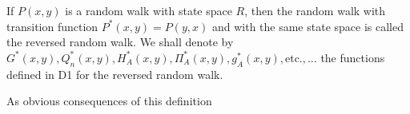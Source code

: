 If $P(x,y)$ is a random walk with state space $R$, then the random walk with transition function $P^*(x,y) = P(y,x)$ and with the same state space is called the reversed random walk. We shall denote by $G^*(x,y), Q_n^*(x,y), H_A^*(x,y), \Pi_A^*(x,y), g_A^*(x,y), \text{etc.}, \ldots$ the functions defined in D1 for the reversed random walk.

As obvious consequences of this definition